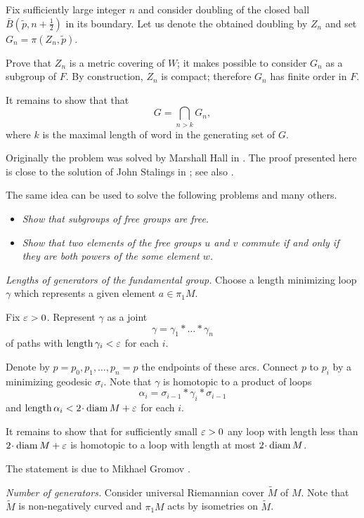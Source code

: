 Fix sufficiently large integer $n$ and consider doubling of the closed ball $\bar B(\tilde p,n+\frac12)$ in its boundary.
Let us denote the obtained doubling by $Z_n$ and set $G_n=\pi(Z_n,\tilde p)$.

Prove that $Z_n$ is a metric covering of $W$;
it makes possible to consider $G_n$ as a subgroup of $F$.
By construction, $Z_n$ is compact;
therefore $G_n$ has finite order in $F$.


It remains to show that that 
\[G=\bigcap_{n>k} G_n,\]
where $k$ is the maximal length of word in the generating set of $G$.
 
Originally the problem was solved by Marshall Hall in \cite{hall}.
The proof presented here is close to the solution of John Stalings in \cite{stallings};
see also \cite{wilton}.

The same idea can be used to solve the following problems and many others.
\begin{itemize}
\item {\it Show that subgroups of free groups are free.}
\item {\it Show that two elements of the free groups $u$ and $v$ commute 
if and only if they are both powers of
the some element $w$.}
\end{itemize}



\textit{Lengths of generators of the fundamental group.}
Choose a length minimizing loop $\gamma$ 
which represents a given element $a\in\pi_1M$.

Fix $\varepsilon>0$.
Represent $\gamma$ 
as a joint 
\[\gamma=\gamma_1{*}\dots{*}\gamma_n\]
of paths with $\operatorname{\rm length}\gamma_i<\varepsilon$ for each $i$.
 
Denote by $p=p_0,p_1,\dots, p_n=p$ the endpoints of these arcs.
Connect $p$ to $p_i$ by a minimizing geodesic $\sigma_i$.
Note that $\gamma$ is homotopic to a product of loops
\[\alpha_i=\sigma_{i-1}{*}\gamma_i{*}\sigma_{i-1}\]
and $\length \alpha_i<2\cdot\diam M+\eps$ for each $i$.

It remains to show that for sufficiently small $\varepsilon>0$
any loop with length less than $2\cdot\diam M+\eps$ 
is homotopic to a loop with length at most $2\cdot\diam M$.

 The statement is due to 
Mikhael Gromov \cite[see Prop. 3.22 in][]{gromov-MetStr}.

\textit{Number of generators.}
Consider universal Riemannian cover $\tilde M$ of $M$.
Note that $\tilde M$ is non-negatively curved and
$\pi_1M$ acts by isometries on $\tilde M$.

